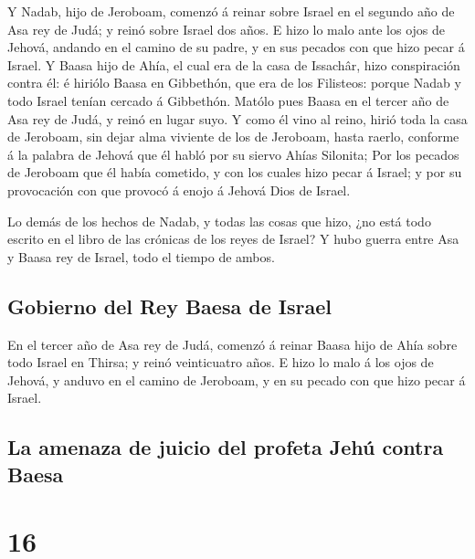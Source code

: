  Y Nadab, hijo de Jeroboam, comenzó á reinar sobre Israel
en el segundo año de Asa rey de Judá; y reinó sobre Israel dos años.
 E hizo lo malo ante los ojos de Jehová, andando en el
camino de su padre, y en sus pecados con que hizo pecar á Israel.
 Y Baasa hijo de Ahía, el cual era de la casa de
Issachâr, hizo conspiración contra él: é hiriólo Baasa en Gibbethón, que
era de los Filisteos: porque Nadab y todo Israel tenían cercado á
Gibbethón.  Matólo pues Baasa en el tercer año de Asa rey
de Judá, y reinó en lugar suyo.  Y como él vino al reino,
hirió toda la casa de Jeroboam, sin dejar alma viviente de los de
Jeroboam, hasta raerlo, conforme á la palabra de Jehová que él habló por
su siervo Ahías Silonita;  Por los pecados de Jeroboam
que él había cometido, y con los cuales hizo pecar á Israel; y por su
provocación con que provocó á enojo á Jehová Dios de Israel.

 Lo demás de los hechos de Nadab, y todas las cosas que
hizo, ¿no está todo escrito en el libro de las crónicas de los reyes de
Israel?  Y hubo guerra entre Asa y Baasa rey de Israel,
todo el tiempo de ambos.

\hypertarget{gobierno-del-rey-baesa-de-israel}{%
\subsection{Gobierno del Rey Baesa de
Israel}\label{gobierno-del-rey-baesa-de-israel}}

 En el tercer año de Asa rey de Judá, comenzó á reinar
Baasa hijo de Ahía sobre todo Israel en Thirsa; y reinó veinticuatro
años.  E hizo lo malo á los ojos de Jehová, y anduvo en
el camino de Jeroboam, y en su pecado con que hizo pecar á Israel.

\hypertarget{la-amenaza-de-juicio-del-profeta-jehuxfa-contra-baesa}{%
\subsection{La amenaza de juicio del profeta Jehú contra
Baesa}\label{la-amenaza-de-juicio-del-profeta-jehuxfa-contra-baesa}}

\hypertarget{section-15}{%
\section{16}\label{section-15}}

